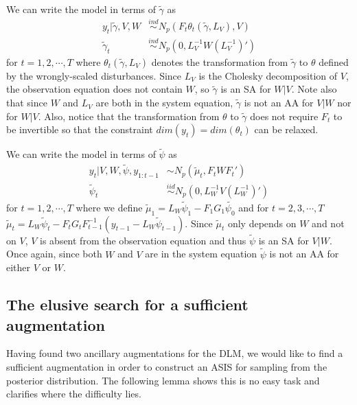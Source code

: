 \documentclass[12pt]{article}
\begin{document}
We can write the model in terms of $\tilde{\gamma}$ as
\begin{align*}
  y_t|\tilde{\gamma},V,W & \stackrel{ind}{\sim} N_p\left(F_t\theta_t(\tilde{\gamma},L_V), V\right)\\
  \tilde{\gamma}_t & \stackrel{ind}{\sim}N_p(0,L_V^{-1}W(L_V^{-1})')
\end{align*}
for $t=1,2,\cdots,T$ where $\theta_t(\tilde{\gamma},L_V)$ denotes the transformation from $\tilde{\gamma}$ to $\theta$ defined by the wrongly-scaled disturbances. Since $L_V$ is the Cholesky decomposition of $V$, the observation equation does not contain $W$, so $\tilde{\gamma}$ is an SA for $W|V$. Note also that since $W$ and $L_V$ are both in the system equation, $\tilde{\gamma}$ is not an AA for $V|W$ nor for $W|V$. Also, notice that the transformation from $\theta$ to $\tilde{\gamma}$ does not require $F_t$ to be invertible so that the constraint $dim(y_t)=dim(\theta_t)$ can be relaxed.

We can write the model in terms of $\tilde{\psi}$ as
 \begin{align*}
   y_t|V,W,\tilde{\psi},y_{1:t-1} &\sim N_p(\tilde{\mu}_t, F_tWF_t')\\
   \tilde{\psi}_t & \stackrel{iid}{\sim} N_p(0,L_W^{-1}V(L_W^{-1})')
\end{align*}
for $t=1,2,\cdots,T$ where we define $\tilde{\mu}_1 = L_W\tilde{\psi}_1 - F_1G_1\tilde{\psi_0}$ and for $t=2,3,\cdots,T$ $\tilde{\mu}_t =L_W\tilde{\psi}_t - F_tG_tF_{t-1}^{-1}(y_{t-1} - L_{W}\tilde{\psi}_{t-1})$. Since $\tilde{\mu}_t$ only depends on $W$ and not on $V$, $V$ is absent from the observation equation and thus $\tilde{\psi}$ is an SA for $V|W$. Once again, since both $W$ and $V$ are in the system equation $\tilde{\psi}$ is not an AA for either $V$ or $W$.

\subsection{The elusive search for a sufficient augmentation}

Having found two ancillary augmentations for the DLM, we would like to find a sufficient augmentation in order to construct an ASIS for sampling from the posterior distribution. The following lemma shows this is no easy task and clarifies where the difficulty lies.
\end{document}
